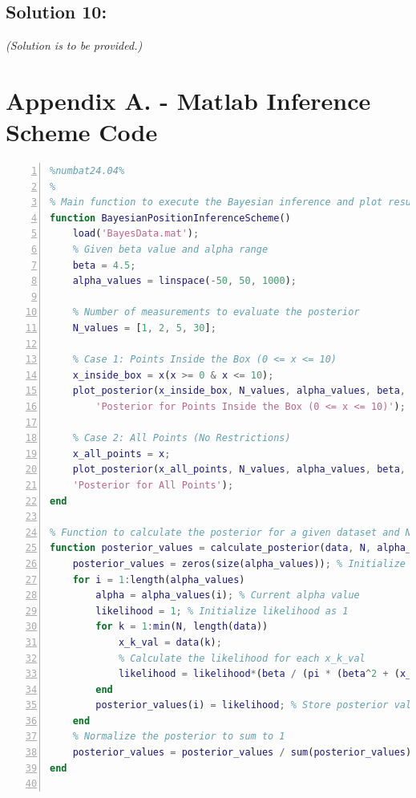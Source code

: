 \documentclass[a4paper,11pt]{article}
\begin{document}
\subsection*{Solution 10:} \emph{(Solution is to be provided.)}







\newpage
\appendix

\makeatother
\section{Appendix A. - Matlab Inference Scheme Code}
\begin{lstlisting}[language=Matlab,
                   numbers=left,
                   basicstyle=\footnotesize,
                   stepnumber=1,
                   numbersep=10pt,
                   tabsize=2,
                   showspaces=false,
                   showstringspaces=false]
%%%%%%%%%Bayesian Position Inference Scheme%%%%%%%%%%%%
%numbat24.04%
%
% Main function to execute the Bayesian inference and plot results
function BayesianPositionInferenceScheme()
    load('BayesData.mat');
    % Given beta value and alpha range
    beta = 4.5;
    alpha_values = linspace(-50, 50, 1000);

    % Number of measurements to evaluate the posterior
    N_values = [1, 2, 5, 30];

    % Case 1: Points Inside the Box (0 <= x <= 10)
    x_inside_box = x(x >= 0 & x <= 10);
    plot_posterior(x_inside_box, N_values, alpha_values, beta, ...
        'Posterior for Points Inside the Box (0 <= x <= 10)');

    % Case 2: All Points (No Restrictions)
    x_all_points = x; 
    plot_posterior(x_all_points, N_values, alpha_values, beta, 
    'Posterior for All Points');
end

% Function to calculate the posterior for a given dataset and N points
function posterior_values = calculate_posterior(data, N, alpha_values, beta)
    posterior_values = zeros(size(alpha_values)); % Initialize posterior array
    for i = 1:length(alpha_values)
        alpha = alpha_values(i); % Current alpha value
        likelihood = 1; % Initialize likelihood as 1
        for k = 1:min(N, length(data))
            x_k_val = data(k);
            % Calculate the likelihood for each x_k_val
            likelihood = likelihood*(beta / (pi * (beta^2 + (x_k_val - alpha)^2)));
        end
        posterior_values(i) = likelihood; % Store posterior value
    end
    % Normalize the posterior to sum to 1
    posterior_values = posterior_values / sum(posterior_values);
end


\end{lstlisting}
\end{document}
